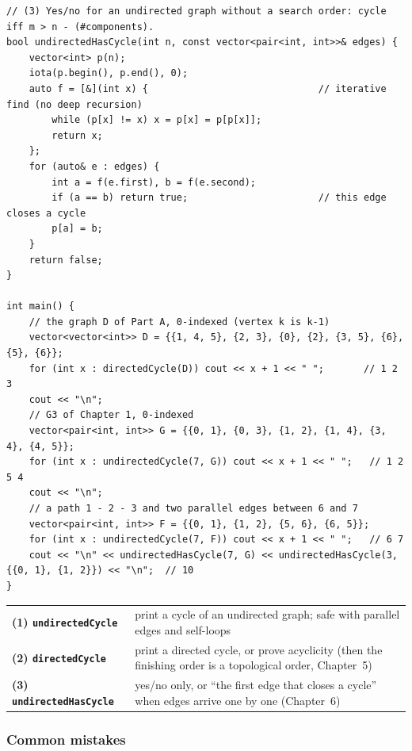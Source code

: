 \begin{lstlisting}[style=cpp]
// (3) Yes/no for an undirected graph without a search order: cycle iff m > n - (#components).
bool undirectedHasCycle(int n, const vector<pair<int, int>>& edges) {
    vector<int> p(n);
    iota(p.begin(), p.end(), 0);
    auto f = [&](int x) {                              // iterative find (no deep recursion)
        while (p[x] != x) x = p[x] = p[p[x]];
        return x;
    };
    for (auto& e : edges) {
        int a = f(e.first), b = f(e.second);
        if (a == b) return true;                       // this edge closes a cycle
        p[a] = b;
    }
    return false;
}

int main() {
    // the graph D of Part A, 0-indexed (vertex k is k-1)
    vector<vector<int>> D = {{1, 4, 5}, {2, 3}, {0}, {2}, {3, 5}, {6}, {5}, {6}};
    for (int x : directedCycle(D)) cout << x + 1 << " ";       // 1 2 3
    cout << "\n";
    // G3 of Chapter 1, 0-indexed
    vector<pair<int, int>> G = {{0, 1}, {0, 3}, {1, 2}, {1, 4}, {3, 4}, {4, 5}};
    for (int x : undirectedCycle(7, G)) cout << x + 1 << " ";   // 1 2 5 4
    cout << "\n";
    // a path 1 - 2 - 3 and two parallel edges between 6 and 7
    vector<pair<int, int>> F = {{0, 1}, {1, 2}, {5, 6}, {6, 5}};
    for (int x : undirectedCycle(7, F)) cout << x + 1 << " ";   // 6 7
    cout << "\n" << undirectedHasCycle(7, G) << undirectedHasCycle(3, {{0, 1}, {1, 2}}) << "\n";  // 10
}
\end{lstlisting}

\begin{insightbox}
\renewcommand{\arraystretch}{1.25}
\begin{tabularx}{\linewidth}{@{}>{\bfseries}l X@{}}
(1) \texttt{undirectedCycle} & print a cycle of an undirected graph; safe with parallel edges and self-loops \\
(2) \texttt{directedCycle} & print a directed cycle, or prove acyclicity (then the finishing order is a topological order, Chapter~5) \\
(3) \texttt{undirectedHasCycle} & yes/no only, or ``the first edge that closes a cycle'' when edges arrive one by one (Chapter~6) \\
\end{tabularx}
\end{insightbox}

\subsubsection*{Common mistakes}

